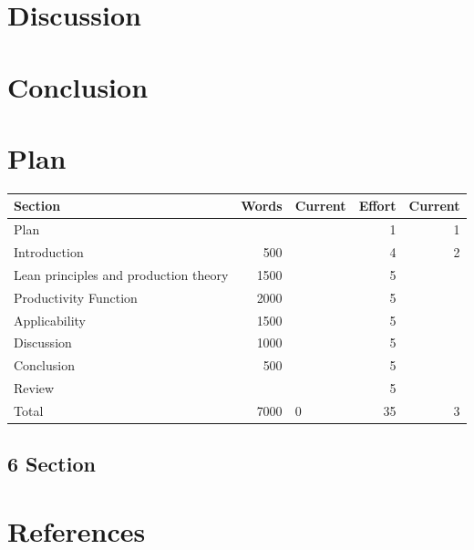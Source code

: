 \documentclass{article}
\begin{document}
\section{Discussion}
\label{sec:org8a208e5}
\section{Conclusion}
\label{sec:orge78260c}

\section{Plan}
\label{sec:orgb49fe70}
\begin{center}
\begin{tabular}{lrlrr}
Section & Words & Current & Effort & Current\\
\hline
Plan &  &  & 1 & 1\\
Introduction & 500 &  & 4 & 2\\
Lean principles and production theory & 1500 &  & 5 & \\
Productivity Function & 2000 &  & 5 & \\
Applicability & 1500 &  & 5 & \\
Discussion & 1000 &  & 5 & \\
Conclusion & 500 &  & 5 & \\
Review &  &  & 5 & \\
\hline
Total & 7000 & 0 & 35 & 3\\
\end{tabular}
\end{center}
\subsection{6 Section}
\label{sec:org36581f3}

\section{References}
\label{sec:org639cbc3}

\printbibliography[title=none]
\end{document}
